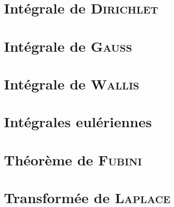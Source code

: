 % 

% 

\section{Intégrale de \textsc{Dirichlet}}


\section{Intégrale de \textsc{Gauss}}


\section{Intégrale de \textsc{Wallis}} \label{integrale_wallis}


\section{Intégrales eulériennes}


\section{Théorème de \textsc{Fubini}}


\section{Transformée de \textsc{Laplace}} 
\label{transformee_laplace}



